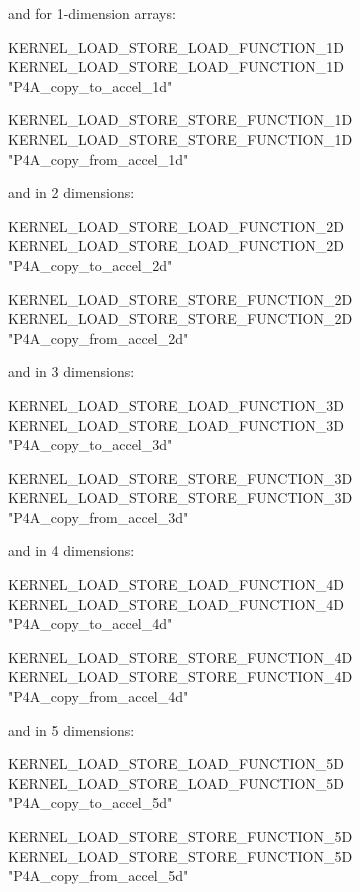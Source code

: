 \documentclass[a4paper]{report}
\begin{document}
and for 1-dimension arrays:
\begin{PipsProp}{KERNEL_LOAD_STORE_LOAD_FUNCTION_1D}
KERNEL_LOAD_STORE_LOAD_FUNCTION_1D "P4A_copy_to_accel_1d"
\end{PipsProp}

\begin{PipsProp}{KERNEL_LOAD_STORE_STORE_FUNCTION_1D}
KERNEL_LOAD_STORE_STORE_FUNCTION_1D "P4A_copy_from_accel_1d"
\end{PipsProp}

and in 2 dimensions:
\begin{PipsProp}{KERNEL_LOAD_STORE_LOAD_FUNCTION_2D}
KERNEL_LOAD_STORE_LOAD_FUNCTION_2D "P4A_copy_to_accel_2d"
\end{PipsProp}

\begin{PipsProp}{KERNEL_LOAD_STORE_STORE_FUNCTION_2D}
KERNEL_LOAD_STORE_STORE_FUNCTION_2D "P4A_copy_from_accel_2d"
\end{PipsProp}

and in 3 dimensions:
\begin{PipsProp}{KERNEL_LOAD_STORE_LOAD_FUNCTION_3D}
KERNEL_LOAD_STORE_LOAD_FUNCTION_3D "P4A_copy_to_accel_3d"
\end{PipsProp}

\begin{PipsProp}{KERNEL_LOAD_STORE_STORE_FUNCTION_3D}
KERNEL_LOAD_STORE_STORE_FUNCTION_3D "P4A_copy_from_accel_3d"
\end{PipsProp}

and in 4 dimensions:
\begin{PipsProp}{KERNEL_LOAD_STORE_LOAD_FUNCTION_4D}
KERNEL_LOAD_STORE_LOAD_FUNCTION_4D "P4A_copy_to_accel_4d"
\end{PipsProp}

\begin{PipsProp}{KERNEL_LOAD_STORE_STORE_FUNCTION_4D}
KERNEL_LOAD_STORE_STORE_FUNCTION_4D "P4A_copy_from_accel_4d"
\end{PipsProp}

and in 5 dimensions:
\begin{PipsProp}{KERNEL_LOAD_STORE_LOAD_FUNCTION_5D}
KERNEL_LOAD_STORE_LOAD_FUNCTION_5D "P4A_copy_to_accel_5d"
\end{PipsProp}

\begin{PipsProp}{KERNEL_LOAD_STORE_STORE_FUNCTION_5D}
KERNEL_LOAD_STORE_STORE_FUNCTION_5D "P4A_copy_from_accel_5d"
\end{PipsProp}
\end{document}
